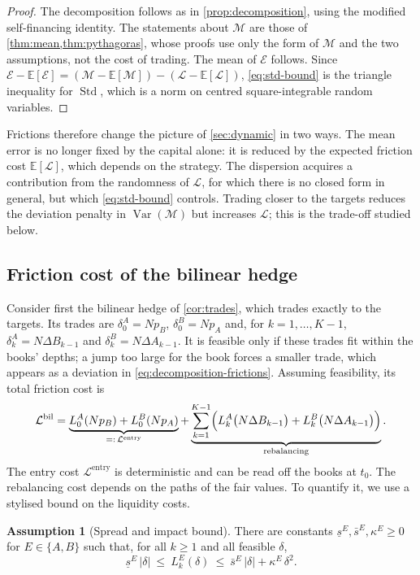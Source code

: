 \documentclass[11pt,a4paper]{article}
\theoremstyle{plain}
\theoremstyle{definition}
\newtheorem{assumption}[theorem]{Assumption}
\theoremstyle{remark}
\newcommand{\E}{\mathbb{E}}
\newcommand{\1}{\mathbf{1}}
\newcommand{\Var}{\operatorname{Var}}
\begin{document}
\begin{proof}
The decomposition follows as in \cref{prop:decomposition}, using the modified self-financing identity. The statements about $\mathcal{M}$ are those of \cref{thm:mean,thm:pythagoras}, whose proofs use only the form of $\mathcal{M}$ and the two assumptions, not the cost of trading. The mean of $\mathcal{E}$ follows. Since $\mathcal{E}-\E[\mathcal{E}] = (\mathcal{M}-\E[\mathcal{M}]) - (\mathcal{L}-\E[\mathcal{L}])$, \eqref{eq:std-bound} is the triangle inequality for $\operatorname{Std}$, which is a norm on centred square-integrable random variables.
\end{proof}

Frictions therefore change the picture of \cref{sec:dynamic} in two ways. The mean error is no longer fixed by the capital alone: it is reduced by the expected friction cost $\E[\mathcal{L}]$, which depends on the strategy. The dispersion acquires a contribution from the randomness of $\mathcal{L}$, for which there is no closed form in general, but which \eqref{eq:std-bound} controls. Trading closer to the targets reduces the deviation penalty in $\Var(\mathcal{M})$ but increases $\mathcal{L}$; this is the trade-off studied below.

\subsection{Friction cost of the bilinear hedge}

Consider first the bilinear hedge of \cref{cor:trades}, which trades exactly to the targets. Its trades are $\delta^A_0 = Np_B$, $\delta^B_0 = Np_A$ and, for $k=1,\dots,K-1$, $\delta^A_k = N\Delta B_{k-1}$ and $\delta^B_k = N\Delta A_{k-1}$. It is feasible only if these trades fit within the books' depths; a jump too large for the book forces a smaller trade, which appears as a deviation in \eqref{eq:decomposition-frictions}. Assuming feasibility, its total friction cost is
\[
\mathcal{L}^{\mathrm{bil}} = \underbrace{L^A_0(Np_B) + L^B_0(Np_A)}_{=:\,\mathcal{L}^{\mathrm{entry}}} + \underbrace{\sum_{k=1}^{K-1}\Bigl(L^A_k\bigl(N\Delta B_{k-1}\bigr) + L^B_k\bigl(N\Delta A_{k-1}\bigr)\Bigr)}_{\text{rebalancing}}.
\]
The entry cost $\mathcal{L}^{\mathrm{entry}}$ is deterministic and can be read off the books at $t_0$. The rebalancing cost depends on the paths of the fair values. To quantify it, we use a stylised bound on the liquidity costs.

\begin{assumption}[Spread and impact bound]
\label{ass:spread-impact}
There are constants $\underline s^E,\bar s^E,\kappa^E\geq 0$ for $E\in\{A,B\}$ such that, for all $k\geq 1$ and all feasible $\delta$,
\[
\underline s^E\,|\delta|\ \leq\ L^E_k(\delta)\ \leq\ \bar s^E\,|\delta| + \kappa^E\,\delta^2.
\]
\end{assumption}
\end{document}
